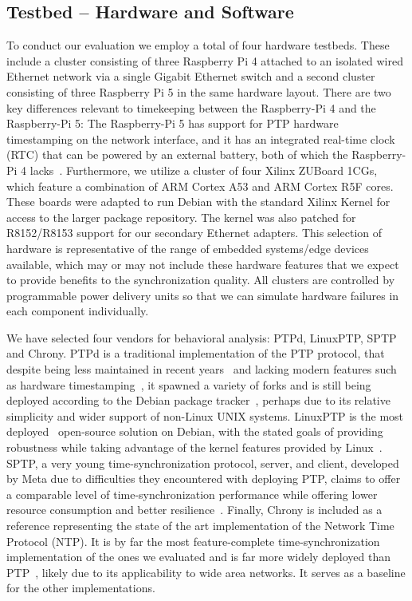 

\subsection{Testbed -- Hardware and Software}

To conduct our evaluation we employ a total of four hardware testbeds. These include a cluster consisting of three Raspberry Pi 4 attached to an isolated wired Ethernet network via a single Gigabit Ethernet switch and a second cluster consisting of three Raspberry Pi 5 in the same hardware layout. There are two key differences relevant to timekeeping between the Raspberry-Pi 4 and the Raspberry-Pi 5: The Raspberry-Pi 5 has support for PTP hardware timestamping on the network interface, and it has an integrated real-time clock (RTC) that can be powered by an external battery, both of which the Raspberry-Pi 4 lacks~\cite{raspberry-pi-datasheets}. Furthermore, we utilize a cluster of four Xilinx ZUBoard 1CGs, which feature a combination of ARM Cortex A53 and ARM Cortex R5F cores. These boards were adapted to run Debian with the standard Xilinx Kernel for access to the larger package repository. The kernel was also patched for R8152/R8153 support for our secondary Ethernet adapters. This selection of hardware is representative of the range of embedded systems/edge devices available, which may or may not include these hardware features that we expect to provide benefits to the synchronization quality. All clusters are controlled by programmable power delivery units so that we can simulate hardware failures in each component individually.

We have selected four vendors for behavioral analysis: PTPd, LinuxPTP, SPTP and Chrony. PTPd is a traditional implementation of the PTP protocol, that despite being less maintained in recent years~\cite{ptpd-maintainers} and lacking modern features such as hardware timestamping~\cite{ptpd-manpage}, it spawned a variety of forks and is still being deployed according to the Debian package tracker~\cite{debian-popularity-contest}, perhaps due to its relative simplicity and wider support of non-Linux UNIX systems. LinuxPTP is the most deployed~\cite{debian-popularity-contest} open-source solution on Debian, with the stated goals of providing robustness while taking advantage of the kernel features provided by Linux~\cite{linuxptp-homepage}. SPTP, a very young time-synchronization protocol, server, and client, developed by Meta due to difficulties they encountered with deploying PTP, claims to offer a comparable level of time-synchronization performance while offering lower resource consumption and better resilience~\cite{facebook-sptp}. Finally, Chrony is included as a reference representing the state of the art implementation of the Network Time Protocol (NTP). It is by far the most feature-complete time-synchronization implementation of the ones we evaluated and is far more widely deployed than PTP~\cite{debian-popularity-contest}, likely due to its applicability to wide area networks. It serves as a baseline for the other implementations.

